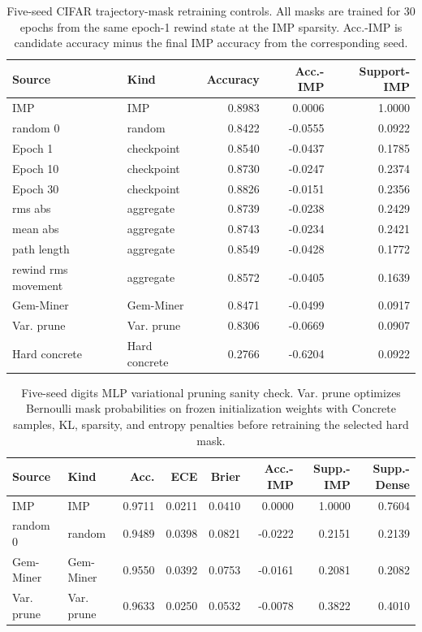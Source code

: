 \begin{table}[t]
\centering
\small
\setlength{\tabcolsep}{4pt}
\begin{tabular}{llrrr}
\toprule
Source & Kind & Accuracy & Acc.-IMP & Support-IMP \\
\midrule
IMP & IMP & 0.8983 & 0.0006 & 1.0000 \\
random 0 & random & 0.8422 & -0.0555 & 0.0922 \\
Epoch 1 & checkpoint & 0.8540 & -0.0437 & 0.1785 \\
Epoch 10 & checkpoint & 0.8730 & -0.0247 & 0.2374 \\
Epoch 30 & checkpoint & 0.8826 & -0.0151 & 0.2356 \\
rms abs & aggregate & 0.8739 & -0.0238 & 0.2429 \\
mean abs & aggregate & 0.8743 & -0.0234 & 0.2421 \\
path length & aggregate & 0.8549 & -0.0428 & 0.1772 \\
rewind rms movement & aggregate & 0.8572 & -0.0405 & 0.1639 \\
Gem-Miner & Gem-Miner & 0.8471 & -0.0499 & 0.0917 \\
Var. prune & Var. prune & 0.8306 & -0.0669 & 0.0907 \\
Hard concrete & Hard concrete & 0.2766 & -0.6204 & 0.0922 \\
\bottomrule
\end{tabular}
\caption{Five-seed CIFAR trajectory-mask retraining controls. All masks are trained for 30 epochs from the same epoch-1 rewind state at the IMP sparsity. Acc.-IMP is candidate accuracy minus the final IMP accuracy from the corresponding seed.}
\label{tab:cifar-trajectory-mask-training}
\end{table}

\begin{table}[t]
\centering
\small
\setlength{\tabcolsep}{4pt}
\begin{tabular}{llrrrrrr}
\toprule
Source & Kind & Acc. & ECE & Brier & Acc.-IMP & Supp.-IMP & Supp.-Dense \\
\midrule
IMP & IMP & 0.9711 & 0.0211 & 0.0410 & 0.0000 & 1.0000 & 0.7604 \\
random 0 & random & 0.9489 & 0.0398 & 0.0821 & -0.0222 & 0.2151 & 0.2139 \\
Gem-Miner & Gem-Miner & 0.9550 & 0.0392 & 0.0753 & -0.0161 & 0.2081 & 0.2082 \\
Var. prune & Var. prune & 0.9633 & 0.0250 & 0.0532 & -0.0078 & 0.3822 & 0.4010 \\
\bottomrule
\end{tabular}
\caption{Five-seed digits MLP variational pruning sanity check. Var. prune optimizes Bernoulli mask probabilities on frozen initialization weights with Concrete samples, KL, sparsity, and entropy penalties before retraining the selected hard mask.}
\label{tab:digits-variational-pruning}
\end{table}

